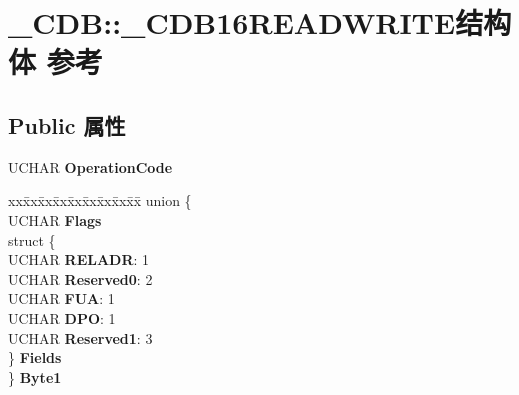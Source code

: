 \hypertarget{struct___c_d_b_1_1___c_d_b16_r_e_a_d_w_r_i_t_e}{}\section{\+\_\+\+C\+DB\+:\+:\+\_\+\+C\+D\+B16\+R\+E\+A\+D\+W\+R\+I\+T\+E结构体 参考}
\label{struct___c_d_b_1_1___c_d_b16_r_e_a_d_w_r_i_t_e}
\subsection*{Public 属性}
\begin{DoxyCompactItemize}
\item 
\mbox{\label{struct___c_d_b_1_1___c_d_b16_r_e_a_d_w_r_i_t_e_a5be0bdc7352fa0b8bbe7397e51105ea3}} 
U\+C\+H\+AR {\bfseries Operation\+Code}
\item 
\mbox{\label{struct___c_d_b_1_1___c_d_b16_r_e_a_d_w_r_i_t_e_a0e3fbfb6fd5d03f5c67807e4763e6c16}} 
\begin{tabbing}
xx\=xx\=xx\=xx\=xx\=xx\=xx\=xx\=xx\=\kill
union \{\\
\>UCHAR {\bfseries Flags}\\
\>struct \{\\
\>\>UCHAR {\bfseries RELADR}: 1\\
\>\>UCHAR {\bfseries Reserved0}: 2\\
\>\>UCHAR {\bfseries FUA}: 1\\
\>\>UCHAR {\bfseries DPO}: 1\\
\>\>UCHAR {\bfseries Reserved1}: 3\\
\>\} {\bfseries Fields}\\
\} {\bfseries Byte1}\\


\end{tabbing}
\end{DoxyCompactItemize}

